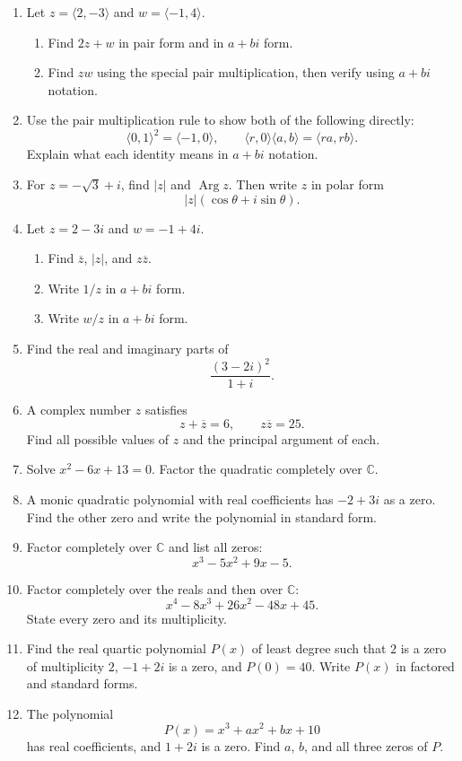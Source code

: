\documentclass[12pt]{article}
\begin{document}
\begin{enumerate}[leftmargin=*,itemsep=1em]
  \item Let $z=\langle2,-3\rangle$ and $w=\langle-1,4\rangle$.
  \begin{enumerate}[label=(\alph*),itemsep=0.3em]
    \item Find $2z+w$ in pair form and in $a+bi$ form.
    \item Find $zw$ using the special pair multiplication, then verify using $a+bi$ notation.
  \end{enumerate}

  \item Use the pair multiplication rule to show both of the following directly:
  \[
    \langle0,1\rangle^2=\langle-1,0\rangle,
    \qquad
    \langle r,0\rangle\langle a,b\rangle=\langle ra,rb\rangle.
  \]
  Explain what each identity means in $a+bi$ notation.

  \item For $z=-\sqrt3+i$, find $|z|$ and $\operatorname{Arg}z$. Then write $z$ in polar form
  \[
    |z|(\cos\theta+i\sin\theta).
  \]

  \item Let $z=2-3i$ and $w=-1+4i$.
  \begin{enumerate}[label=(\alph*),itemsep=0.3em]
    \item Find $\overline z$, $|z|$, and $z\overline z$.
    \item Write $1/z$ in $a+bi$ form.
    \item Write $w/z$ in $a+bi$ form.
  \end{enumerate}

  \item Find the real and imaginary parts of
  \[
    \frac{(3-2i)^2}{1+i}.
  \]

  \item A complex number $z$ satisfies
  \[
    z+\overline z=6,
    \qquad
    z\overline z=25.
  \]
  Find all possible values of $z$ and the principal argument of each.

  \item Solve $x^2-6x+13=0$. Factor the quadratic completely over $\mathbb C$.

  \item A monic quadratic polynomial with real coefficients has $-2+3i$ as a zero. Find the other zero and write the polynomial in standard form.

  \item Factor completely over $\mathbb C$ and list all zeros:
  \[
    x^3-5x^2+9x-5.
  \]

  \item Factor completely over the reals and then over $\mathbb C$:
  \[
    x^4-8x^3+26x^2-48x+45.
  \]
  State every zero and its multiplicity.

  \item Find the real quartic polynomial $P(x)$ of least degree such that $2$ is a zero of multiplicity $2$, $-1+2i$ is a zero, and $P(0)=40$. Write $P(x)$ in factored and standard forms.

  \item The polynomial
  \[
    P(x)=x^3+ax^2+bx+10
  \]
  has real coefficients, and $1+2i$ is a zero. Find $a$, $b$, and all three zeros of $P$.
\end{enumerate}
\end{document}

